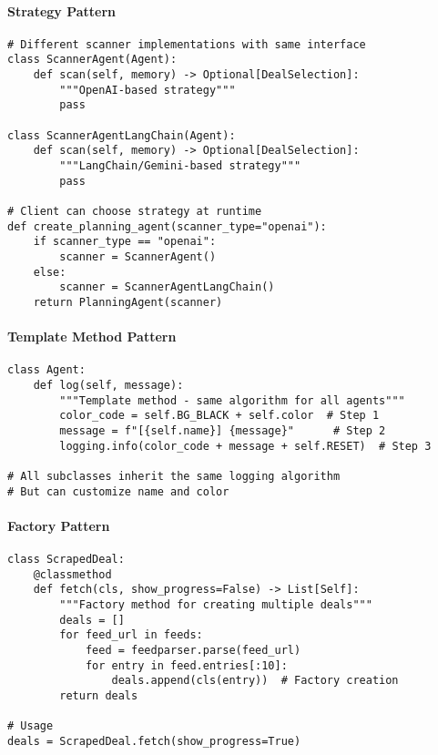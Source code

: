 \paragraph{Strategy Pattern \starfull\starfull\starfull\starempty\starempty}
\begin{lstlisting}[caption=Strategy Pattern Summary]
# Different scanner implementations with same interface
class ScannerAgent(Agent):
    def scan(self, memory) -> Optional[DealSelection]:
        """OpenAI-based strategy"""
        pass

class ScannerAgentLangChain(Agent):
    def scan(self, memory) -> Optional[DealSelection]:
        """LangChain/Gemini-based strategy"""
        pass

# Client can choose strategy at runtime
def create_planning_agent(scanner_type="openai"):
    if scanner_type == "openai":
        scanner = ScannerAgent()
    else:
        scanner = ScannerAgentLangChain()
    return PlanningAgent(scanner)
\end{lstlisting}

\paragraph{Template Method Pattern \starfull\starfull\starfull\starempty\starempty}
\begin{lstlisting}[caption=Template Method Pattern Summary]
class Agent:
    def log(self, message):
        """Template method - same algorithm for all agents"""
        color_code = self.BG_BLACK + self.color  # Step 1
        message = f"[{self.name}] {message}"      # Step 2
        logging.info(color_code + message + self.RESET)  # Step 3

# All subclasses inherit the same logging algorithm
# But can customize name and color
\end{lstlisting}

\paragraph{Factory Pattern \starfull\starfull\starfull\starempty\starempty}
\begin{lstlisting}[caption=Factory Pattern Summary]
class ScrapedDeal:
    @classmethod
    def fetch(cls, show_progress=False) -> List[Self]:
        """Factory method for creating multiple deals"""
        deals = []
        for feed_url in feeds:
            feed = feedparser.parse(feed_url)
            for entry in feed.entries[:10]:
                deals.append(cls(entry))  # Factory creation
        return deals

# Usage
deals = ScrapedDeal.fetch(show_progress=True)
\end{lstlisting}

